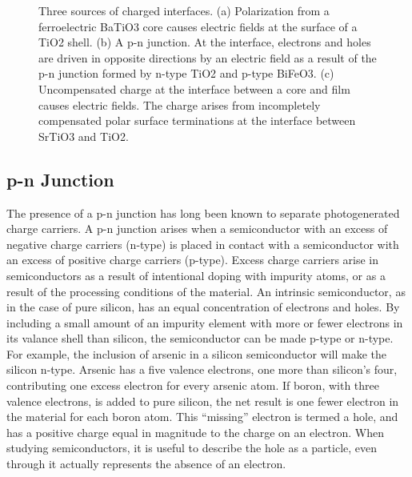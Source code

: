 \documentclass[12pt,%
              twoside,
               letterpaper]{uiothesis}
\begin{document}
\begin{figure}

		\caption[Three sources of charged interfaces]{%
			Three sources of charged interfaces. (a) Polarization from a 
			ferroelectric BaTiO3 core causes electric fields at the 
			surface of a TiO2 shell. (b) A p-n junction. At the 
			interface, electrons and holes are driven in opposite directions 
			by an electric field as a result of the p-n junction formed by 
			n-type TiO2 and p-type BiFeO3. (c) Uncompensated 
			charge at the interface between a core and film causes electric 
			fields. The charge arises from incompletely compensated polar 
			surface terminations at the interface between SrTiO3 and 
			TiO2.}
	\label{fig:chargedinterfaces}

\end{figure}


\subsection{p-n Junction}
\label{subsec:background.pnjunction}


The presence of a p-n junction has long been known to separate photogenerated charge
carriers. A p-n junction arises when a semiconductor with an excess of negative charge
carriers (n-type) is placed in contact with a semiconductor with an excess of positive
charge carriers (p-type). Excess charge carriers arise in semiconductors as a result of
intentional doping with impurity atoms, or as a result of the processing conditions of the
material. An intrinsic semiconductor, as in the case of pure silicon, has an equal
concentration of electrons and holes. By including a small amount of an impurity element
with more or fewer electrons in its valance shell than silicon, the semiconductor can be
made p-type or n-type. For example, the inclusion of arsenic in a silicon semiconductor
will make the silicon n-type. Arsenic has a five valence electrons, one more than
silicon's four, contributing one excess electron for every arsenic atom. If boron, with
three valence electrons, is added to pure silicon, the net result is one fewer electron in
the material for each boron atom. This ``missing'' electron is termed a hole, and has a
positive charge equal in magnitude to the charge on an electron. When studying
semiconductors, it is useful to describe the hole as a particle, even through it actually
represents the absence of an electron. 
\end{document}
